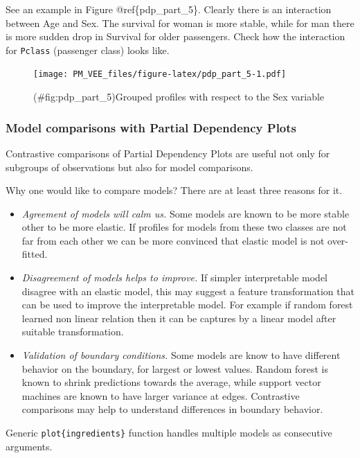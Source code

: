 \documentclass[]{krantz}
\providecommand{\tightlist}{%
  \setlength{\itemsep}{0pt}\setlength{\parskip}{0pt}}
\theoremstyle{definition}
\theoremstyle{definition}
\theoremstyle{definition}
\theoremstyle{remark}
\begin{document}
See an example in Figure @ref\{pdp\_part\_5\}. Clearly there is an
interaction between Age and Sex. The survival for woman is more stable,
while for man there is more sudden drop in Survival for older
passengers. Check how the interaction for \texttt{Pclass} (passenger
class) looks like.

\begin{figure}
\centering
\texttt{[image: PM\_VEE\_files/figure-latex/pdp\_part\_5-1.pdf]}
\caption{(\#fig:pdp\_part\_5)Grouped profiles with respect to the Sex
variable}
\end{figure}

\hypertarget{model-comparisons-with-partial-dependency-plots}{%
\subsubsection{Model comparisons with Partial Dependency
Plots}\label{model-comparisons-with-partial-dependency-plots}}

Contrastive comparisons of Partial Dependency Plots are useful not only
for subgroups of observations but also for model comparisons.

Why one would like to compare models? There are at least three reasons
for it.

\begin{itemize}
\tightlist
\item
  \emph{Agreement of models will calm us.} Some models are known to be
  more stable other to be more elastic. If profiles for models from
  these two classes are not far from each other we can be more convinced
  that elastic model is not over-fitted.
\item
  \emph{Disagreement of models helps to improve.} If simpler
  interpretable model disagree with an elastic model, this may suggest a
  feature transformation that can be used to improve the interpretable
  model. For example if random forest learned non linear relation then
  it can be captures by a linear model after suitable transformation.
\item
  \emph{Validation of boundary conditions.} Some models are know to have
  different behavior on the boundary, for largest or lowest values.
  Random forest is known to shrink predictions towards the average,
  while support vector machines are known to have larger variance at
  edges. Contrastive comparisons may help to understand differences in
  boundary behavior.
\end{itemize}

Generic \texttt{plot\{ingredients\}} function handles multiple models as
consecutive arguments.
\end{document}

